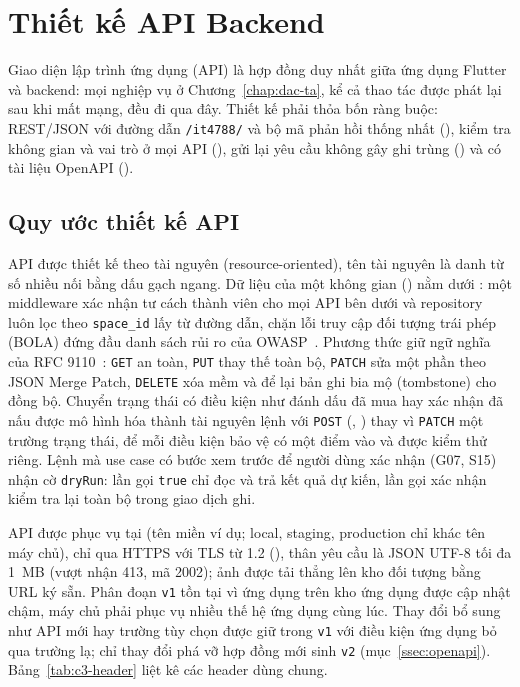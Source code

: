 \section{Thiết kế API Backend}\label{sec:api}

Giao diện lập trình ứng dụng (API) là hợp đồng duy nhất giữa ứng dụng Flutter và backend: mọi nghiệp vụ ở Chương~\ref{chap:dac-ta}, kể cả thao tác được phát lại sau khi mất mạng, đều đi qua đây. Thiết kế phải thỏa bốn ràng buộc: REST/JSON với đường dẫn \texttt{/it4788/} và bộ mã phản hồi thống nhất (), kiểm tra không gian và vai trò ở mọi API (), gửi lại yêu cầu không gây ghi trùng () và có tài liệu OpenAPI ().

\subsection{Quy ước thiết kế API}\label{ssec:quy-uoc-api}

API được thiết kế theo tài nguyên (resource-oriented), tên tài nguyên là danh từ số nhiều nối bằng dấu gạch ngang. Dữ liệu của một không gian () nằm dưới : một middleware xác nhận tư cách thành viên cho mọi API bên dưới và repository luôn lọc theo \texttt{space\_id} lấy từ đường dẫn, chặn lỗi truy cập đối tượng trái phép (BOLA) đứng đầu danh sách rủi ro của OWASP~\cite{owaspapi}. Phương thức giữ ngữ nghĩa của RFC 9110~\cite{rfc9110}: \texttt{GET} an toàn, \texttt{PUT} thay thế toàn bộ, \texttt{PATCH} sửa một phần theo JSON Merge Patch, \texttt{DELETE} xóa mềm và để lại bản ghi bia mộ (tombstone) cho đồng bộ. Chuyển trạng thái có điều kiện như đánh dấu đã mua hay xác nhận đã nấu được mô hình hóa thành tài nguyên lệnh với \texttt{POST} (, ) thay vì \texttt{PATCH} một trường trạng thái, để mỗi điều kiện bảo vệ có một điểm vào và được kiểm thử riêng. Lệnh mà use case có bước xem trước để người dùng xác nhận (G07, S15) nhận cờ \texttt{dryRun}: lần gọi \texttt{true} chỉ đọc và trả kết quả dự kiến, lần gọi xác nhận kiểm tra lại toàn bộ trong giao dịch ghi.

API được phục vụ tại  (tên miền ví dụ; local, staging, production chỉ khác tên máy chủ), chỉ qua HTTPS với TLS từ 1.2 (), thân yêu cầu là JSON UTF-8 tối đa 1~MB (vượt nhận 413, mã 2002); ảnh được tải thẳng lên kho đối tượng bằng URL ký sẵn. Phân đoạn \texttt{v1} tồn tại vì ứng dụng trên kho ứng dụng được cập nhật chậm, máy chủ phải phục vụ nhiều thế hệ ứng dụng cùng lúc. Thay đổi bổ sung như API mới hay trường tùy chọn được giữ trong \texttt{v1} với điều kiện ứng dụng bỏ qua trường lạ; chỉ thay đổi phá vỡ hợp đồng mới sinh \texttt{v2} (mục~\ref{ssec:openapi}). Bảng~\ref{tab:c3-header} liệt kê các header dùng chung.

